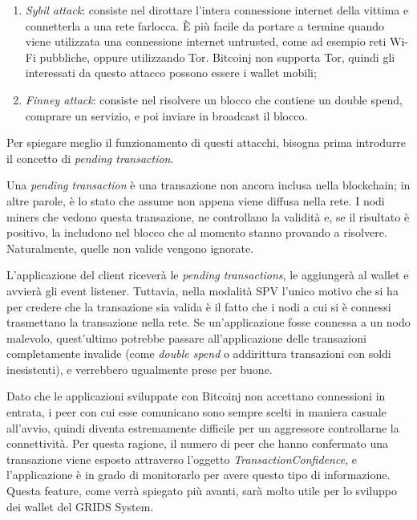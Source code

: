 \begin{enumerate}
    \item \textit{Sybil attack}: consiste nel dirottare l'intera connessione internet della vittima e connetterla a una rete farlocca. È più facile da portare a termine quando viene utilizzata una connessione internet untrusted, come ad esempio reti Wi-Fi pubbliche, oppure utilizzando Tor. Bitcoinj non supporta Tor, quindi gli interessati da questo attacco possono essere i wallet mobili; 
    \item \textit{Finney attack}: consiste nel risolvere un blocco che contiene un double spend, comprare un servizio, e poi inviare in broadcast il blocco.
\end{enumerate}

Per spiegare meglio il funzionamento di questi attacchi, bisogna prima introdurre il concetto di \textit{pending transaction}.

Una \textit{pending transaction} è una transazione non ancora inclusa nella blockchain; in altre parole, è lo stato che assume non appena viene diffusa nella rete. I nodi miners che vedono questa transazione, ne controllano la validità e, se il risultato è positivo, la includono nel blocco che al momento stanno provando a risolvere. Naturalmente, quelle non valide vengono ignorate.

L'applicazione del client riceverà le \textit{pending transactions}, le aggiungerà al wallet e avvierà gli event listener. Tuttavia, nella modalità SPV l'unico motivo che si ha per credere che la transazione sia valida è il fatto che i nodi a cui si è connessi trasmettano la transazione nella rete. Se un'applicazione fosse connessa a un nodo malevolo, quest'ultimo potrebbe passare all'applicazione delle transazioni completamente invalide (come \textit{double spend} o addirittura transazioni con soldi inesistenti), e verrebbero ugualmente prese per buone. 

Dato che le applicazioni sviluppate con Bitcoinj non accettano connessioni in entrata, i peer con cui esse comunicano sono sempre scelti in maniera casuale all'avvio, quindi diventa estremamente difficile per un aggressore controllarne la connettività. Per questa ragione, il numero di peer che hanno confermato una transazione viene esposto attraverso l'oggetto \textit{TransactionConfidence}, e l'applicazione è in grado di monitorarlo per avere questo tipo di informazione. Questa feature, come verrà spiegato più avanti, sarà molto utile per lo sviluppo dei wallet del GRIDS System.

